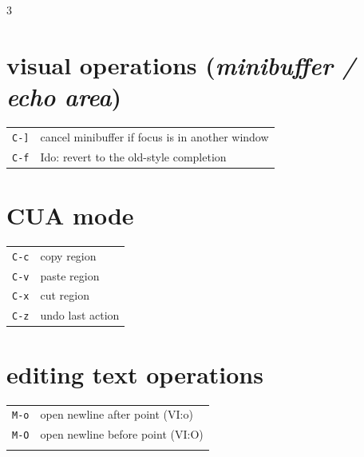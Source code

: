 \documentclass[11pt,landscape,a4paper]{article}
\begin{document}
\begin{multicols}{3}
\section{visual operations (\textit{minibuffer / echo area})}

\begin{tabular}{@{}ll@{}}
	{\verb|C-]|} 			& cancel minibuffer if focus is in another window\\ %
	{\color{cgreen}\verb|C-f|} 		& Ido: revert to the old-style completion\\
\end{tabular}

\vfill\null

\section{CUA mode}

\begin{tabular}{@{}ll@{}}
	{\color{darkred}\verb|C-c|} 	& copy region												\\ 
	{\color{darkred}\verb|C-v|} 	& paste region											\\ %
	{\color{darkred}\verb|C-x|} 	& cut region									 			\\
	{\color{darkred}\verb|C-z|} 	& undo last action									\\ %
\end{tabular}

\columnbreak


	
\section{editing text operations}


\begin{tabular}{@{}ll@{}}
{\color{darkred}\verb|M-o|} 					&  open newline after point (VI:o)\\ 
{\color{darkred}\verb|M-O|} 					&  open newline before point (VI:O)\\ 
\\
\end{tabular}




\end{multicols}
\end{document}
